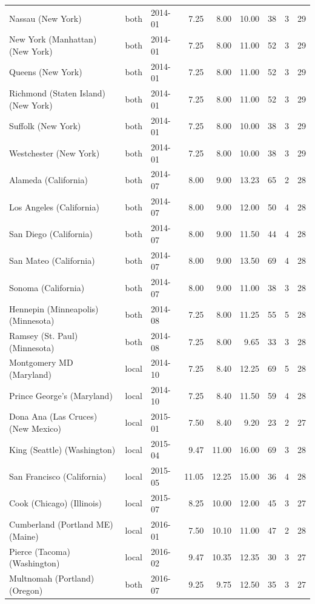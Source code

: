 \documentclass[12pt]{article}
\begin{document}
\begin{table}
\begin{tabular}{lllrrrrrr}
Nassau (New York) & both & 2014-01 & 7.25 & 8.00 & 10.00 & 38 & 3 & 29 \\
New York (Manhattan) (New York) & both & 2014-01 & 7.25 & 8.00 & 11.00 & 52 & 3 & 29 \\
Queens (New York) & both & 2014-01 & 7.25 & 8.00 & 11.00 & 52 & 3 & 29 \\
Richmond (Staten Island) (New York) & both & 2014-01 & 7.25 & 8.00 & 11.00 & 52 & 3 & 29 \\
Suffolk (New York) & both & 2014-01 & 7.25 & 8.00 & 10.00 & 38 & 3 & 29 \\
Westchester (New York) & both & 2014-01 & 7.25 & 8.00 & 10.00 & 38 & 3 & 29 \\
Alameda (California) & both & 2014-07 & 8.00 & 9.00 & 13.23 & 65 & 2 & 28 \\
Los Angeles (California) & both & 2014-07 & 8.00 & 9.00 & 12.00 & 50 & 4 & 28 \\
San Diego (California) & both & 2014-07 & 8.00 & 9.00 & 11.50 & 44 & 4 & 28 \\
San Mateo (California) & both & 2014-07 & 8.00 & 9.00 & 13.50 & 69 & 4 & 28 \\
Sonoma (California) & both & 2014-07 & 8.00 & 9.00 & 11.00 & 38 & 3 & 28 \\
Hennepin (Minneapolis) (Minnesota) & both & 2014-08 & 7.25 & 8.00 & 11.25 & 55 & 5 & 28 \\
Ramsey (St. Paul) (Minnesota) & both & 2014-08 & 7.25 & 8.00 & 9.65 & 33 & 3 & 28 \\
Montgomery MD (Maryland) & local & 2014-10 & 7.25 & 8.40 & 12.25 & 69 & 5 & 28 \\
Prince George's (Maryland) & local & 2014-10 & 7.25 & 8.40 & 11.50 & 59 & 4 & 28 \\
Dona Ana (Las Cruces) (New Mexico) & local & 2015-01 & 7.50 & 8.40 & 9.20 & 23 & 2 & 27 \\
King (Seattle) (Washington) & local & 2015-04 & 9.47 & 11.00 & 16.00 & 69 & 3 & 28 \\
San Francisco (California) & local & 2015-05 & 11.05 & 12.25 & 15.00 & 36 & 4 & 28 \\
Cook (Chicago) (Illinois) & local & 2015-07 & 8.25 & 10.00 & 12.00 & 45 & 3 & 27 \\
Cumberland (Portland ME) (Maine) & local & 2016-01 & 7.50 & 10.10 & 11.00 & 47 & 2 & 28 \\
Pierce (Tacoma) (Washington) & local & 2016-02 & 9.47 & 10.35 & 12.35 & 30 & 3 & 27 \\
Multnomah (Portland) (Oregon) & both & 2016-07 & 9.25 & 9.75 & 12.50 & 35 & 3 & 27 \\

\end{tabular}
\end{table}
\end{document}
